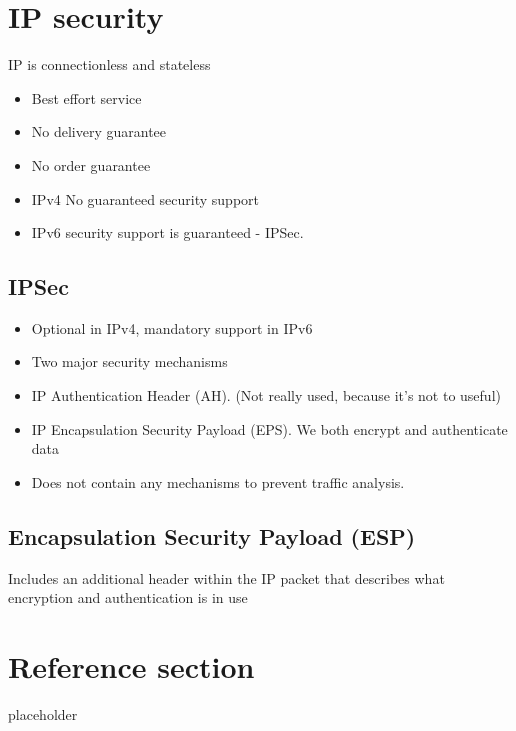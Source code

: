\documentclass{article}
\begin{document}
\tableofcontents

\newpage

\section{IP security}

IP is connectionless and stateless
\begin{itemize}
	\item Best effort service 
	\item No delivery guarantee 
	\item No order guarantee 
	\item IPv4 No guaranteed security support 
	\item IPv6 security support is guaranteed - IPSec.
\end{itemize}

\subsection{IPSec}
\begin{itemize}
	\item Optional in IPv4, mandatory support in IPv6 
	\item Two major security mechanisms 
	\item IP Authentication Header (AH). (Not really used, because it's not to useful)
	\item IP Encapsulation Security Payload (EPS). We both encrypt and authenticate data
	\item Does not contain any mechanisms to prevent traffic analysis.
\end{itemize}

\subsection{Encapsulation Security Payload (ESP)}
\begin{flushleft}
Includes an additional header within the IP packet that describes what encryption and authentication is in use
\end{flushleft}


\pagebreak
\section*{Reference section} \label{sec:reference}
\begin{description}
	\item[placeholder] \hfill \\
\end{description}
\end{document}
